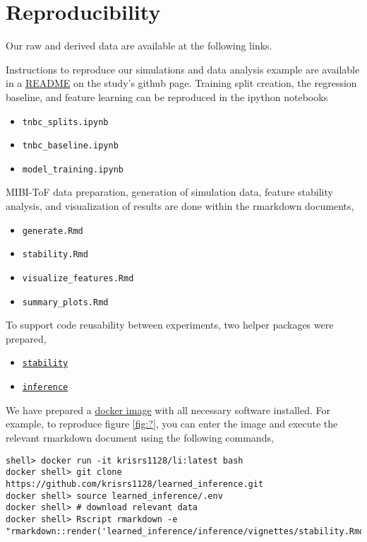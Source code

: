 
\section{Reproducibility}

Our raw and derived data are available at the following links.

Instructions to reproduce our simulations and data analysis example are
available in a \href{https://github.com/krisrs1128/learned_inference}{README} on
the study's github page. Training split creation, the regression baseline, and
feature learning can be reproduced in the ipython notebooks

\begin{itemize}
\item \texttt{tnbc\_splits.ipynb}
\item \texttt{tnbc\_baseline.ipynb}
\item \texttt{model\_training.ipynb}
\end{itemize}

MIBI-ToF data preparation, generation of simulation data, feature stability
analysis, and visualization of results are done within the rmarkdown documents,

\begin{itemize}
\item \texttt{generate.Rmd}
\item \texttt{stability.Rmd}
\item \texttt{visualize\_features.Rmd}
\item \texttt{summary\_plots.Rmd}
\end{itemize}

To support code reusability between experiments, two helper packages were prepared,

\begin{itemize}
\item \href{https://github.com/krisrs1128/learned_inference/tree/master/stability}{\texttt{stability}}
\item \href{https://github.com/krisrs1128/learned_inference/tree/master/inference}{\texttt{inference}}
\end{itemize}

We have prepared a \href{https://hub.docker.com/r/krisrs1128/li}{docker image}
with all necessary software installed. For example, to reproduce figure
\ref{fig:?}, you can enter the image and execute the relevant rmarkdown document
using the following commands,

\begin{verbatim}
shell> docker run -it krisrs1128/li:latest bash
docker shell> git clone https://github.com/krisrs1128/learned_inference.git
docker shell> source learned_inference/.env
docker shell> # download relevant data
docker shell> Rscript rmarkdown -e "rmarkdown::render('learned_inference/inference/vignettes/stability.Rmd')"
\end{verbatim}

